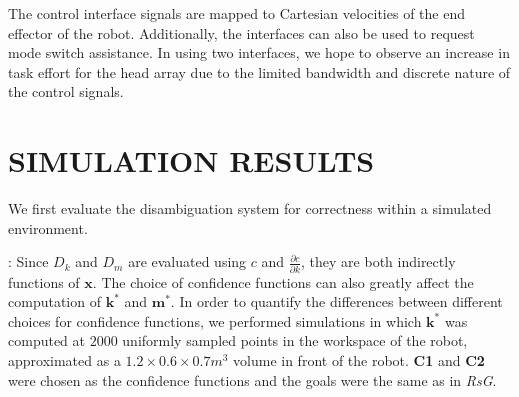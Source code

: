 \documentclass[conference]{IEEEtran}
\begin{document}

The control interface signals are mapped to Cartesian velocities of the end effector of the robot. Additionally, the interfaces can also be used to request mode switch assistance. In using two interfaces, we hope to observe an increase in task effort for the head array due to the limited bandwidth and discrete nature of the control signals. 
\section{SIMULATION RESULTS} \label{SIMRESULTS}
We first evaluate the disambiguation system for correctness within a simulated environment.

: Since $D_{k}$ and $D_{m}$ are evaluated using $c$ and $\frac{\partial c}{\partial k}$, they are both indirectly functions of $\boldsymbol{x}$. The choice of confidence functions can also greatly affect the computation of $\boldsymbol{k}^*$ and $\boldsymbol{m}^*$. In order to quantify the differences between different choices for confidence functions, we performed simulations in which $\boldsymbol{k}^*$ was computed at $2000$ uniformly sampled points in the workspace of the robot, approximated as a $1.2\times0.6\times0.7 m^3$ volume in front of the robot. \textbf{C1} and \textbf{C2} were chosen as the confidence functions and the goals were the same as in \textit{RsG}. 
\end{document}
